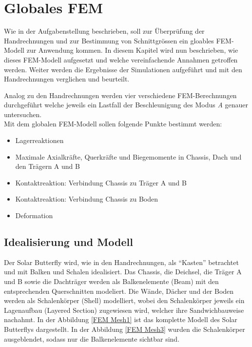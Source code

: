 \section{Globales FEM}
Wie in der Aufgabenstellung beschrieben, soll zur Überprüfung der Handrechnungen und zur Bestimmung von Schnittgrössen ein gloables FEM-Modell zur Anwendung kommen. In diesem Kapitel wird nun beschrieben, wie dieses FEM-Modell aufgesetzt und welche vereinfachende Annahmen getroffen werden. Weiter werden die Ergebnisse der Simulationen aufgeführt und mit den Handrechnungen verglichen und beurteilt.

Analog zu den Handrechnungen werden vier verschiedene FEM-Berechnungen durchgeführt welche jeweils ein Lastfall der Beschleunigung des Modus \emph{A} genauer untersuchen.\\

Mit dem globalen FEM-Modell sollen folgende Punkte bestimmt werden:
\begin{itemize}
  \item Lagerreaktionen
  \item Maximale Axialkräfte, Querkräfte und Biegemomente in Chassis, Dach und den Trägern A und B
  \item Kontaktreaktion: Verbindung Chassis zu Träger A und B
  \item Kontaktreaktion: Verbindung Chassis zu Boden
  \item Deformation
\end{itemize}

\subsection{Idealisierung und Modell}
Der Solar Butterfly wird, wie in den Handrechnungen, als ``Kasten'' betrachtet und mit Balken und Schalen idealisiert. Das Chassis, die Deichsel, die Träger A und B sowie die Dachträger werden als Balkenelemente (Beam) mit den entsprechenden Querschnitten modeliert. Die Wände, Dächer und der Boden werden als Schalenkörper (Shell) modelliert, wobei den Schalenkörper jeweils ein Lagenaufbau (Layered Section) zugewiesen wird, welcher ihre Sandwichbauweise nachahmt. In der Abbildung \ref{FEM Mesh1} ist das komplette Modell des Solar Butterflys dargestellt. In der Abbildung \ref{FEM Mesh3} wurden die Schalenkörper ausgeblendet, sodass nur die Balkenelemente sichtbar sind.

